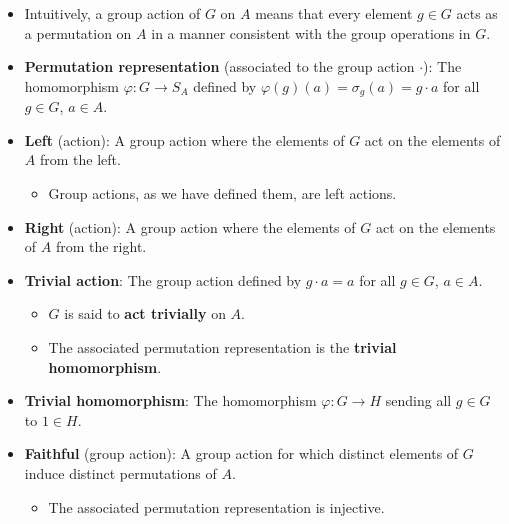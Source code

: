 \documentclass[../notes.tex]{subfiles}
\begin{document}
\begin{itemize}
\begin{enumerate}
\begin{proof}
\begin{align*}
                &= g_1\cdot(g_2\cdot a)\\
                &= g_1\cdot\sigma_{g_2}(a)\\
                &= \sigma_{g_1}(\sigma_{g_2}(a))\\
                &= (\sigma_{g_1}\circ\sigma_{g_2})(a)\\
                &= (\varphi(g_1)\circ\varphi(g_2))(a)
            \end{align*}
        \end{proof}
    \end{enumerate}
    \item Intuitively, a group action of $G$ on $A$ means that every element $g\in G$ acts as a permutation on $A$ in a manner consistent with the group operations in $G$.
    \item \textbf{Permutation representation} (associated to the group action $\cdot$): The homomorphism $\varphi:G\to S_A$ defined by $\varphi(g)(a)=\sigma_g(a)=g\cdot a$ for all $g\in G$, $a\in A$.
    \item \textbf{Left} (action): A group action where the elements of $G$ act on the elements of $A$ from the left.
    \begin{itemize}
        \item Group actions, as we have defined them, are left actions.
    \end{itemize}
    \item \textbf{Right} (action): A group action where the elements of $G$ act on the elements of $A$ from the right.
    \item \textbf{Trivial action}: The group action defined by $g\cdot a=a$ for all $g\in G$, $a\in A$.
    \begin{itemize}
        \item $G$ is said to \textbf{act trivially} on $A$.
        \item The associated permutation representation is the \textbf{trivial homomorphism}.
    \end{itemize}
    \item \textbf{Trivial homomorphism}: The homomorphism $\varphi:G\to H$ sending all $g\in G$ to $1\in H$.
    \item \textbf{Faithful} (group action): A group action for which distinct elements of $G$ induce distinct permutations of $A$.
    \begin{itemize}
        \item The associated permutation representation is injective.
    \end{itemize}

\end{itemize}
\end{document}
